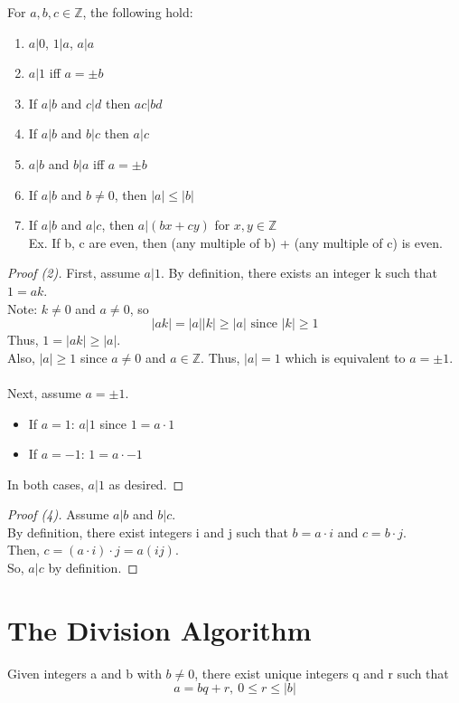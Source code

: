     \begin{theorem}
        For $a,b,c\in\mathbb{Z}$, the following hold:
        \begin{enumerate}
            \item $a|0$, $1|a$, $a|a$
            \item $a|1$ iff $a=\pm b$
            \item If $a|b$ and $c|d$ then $ac|bd$
            \item If $a|b$ and $b|c$ then $a|c$
            \item $a|b$ and $b|a$ iff $a=\pm b$
            \item If $a|b$ and $b\neq 0$, then $|a|\leq |b|$
            \item If $a|b$ and $a|c$, then $a|(bx+cy)$ for $x,y\in\mathbb{Z}$ \\
                Ex. If b, c are even, then (any multiple of b) +
                (any multiple of c) is even.
        \end{enumerate}

        \begin{proof} [Proof (2)]
            First, assume $a|1$. By definition, there exists an integer k 
            such that $1=ak$. \\ Note: $k\neq 0$ and $a\neq 0$, so
            \[ |ak|=|a||k| \geq |a| \text{ since } |k| \geq 1 \]
            Thus, $1=|ak|\geq |a|$. \\
            Also, $|a|\geq 1$ since $a\neq 0$ and $a\in\mathbb{Z}$.
            Thus, $|a|=1$ which is equivalent to $a=\pm 1$. \\\\
            Next, assume $a=\pm 1$.
            \begin{itemize}
                \item If $a=1$: $a|1$ since $1=a\cdot 1$
                \item If $a=-1$: $1=a\cdot -1$
            \end{itemize}
            In both cases, $a|1$ as desired.
        \end{proof}

        \begin{proof} [Proof (4)]
            Assume $a|b$ and $b|c$. \\
            By definition, there exist integers i and j such that 
            $b=a\cdot i$ and $c=b\cdot j$. \\
            Then, $c=(a\cdot i)\cdot j=a(ij)$. \\
            So, $a|c$ by definition.
        \end{proof}
    \end{theorem}

\section{The Division Algorithm}
    \begin{theorem}
        Given integers a and b with $b\neq 0$, there exist unique integers q and r such that
        \[ a=bq+r,\ 0\leq r\leq |b| \]
    \end{theorem}

